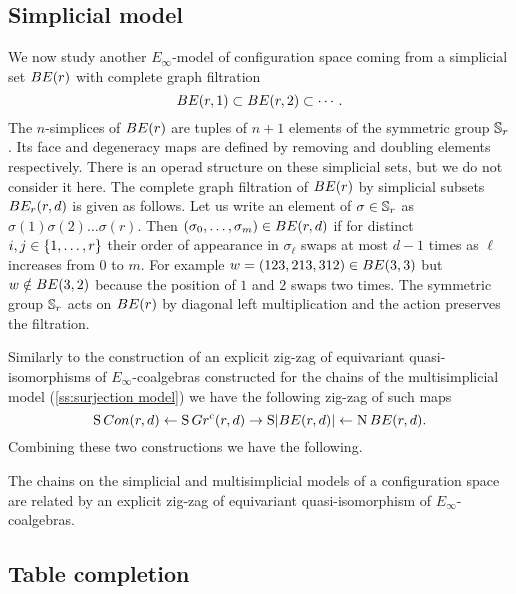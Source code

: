 \subsection{Simplicial model}\label{ss:simplicial model}

We now study another $E_\infty$-model of configuration space coming from a simplicial set $BE(r)$ with complete graph filtration
\[
BE(r,1) \subset BE(r,2) \subset \dotsb \,.
\]
The $n$-simplices of $BE(r)$ are tuples of $n+1$ elements of the symmetric group $\mathbb{S}_r$.
Its face and degeneracy maps are defined by removing and doubling elements respectively.
There is an operad structure on these simplicial sets, but we do not consider it here.
The complete graph filtration of $BE(r)$ by simplicial subsets $BE_r(r,d)$ is given as follows.
Let us write an element of $\sigma \in \mathbb{S}_r$ as $\sigma(1)\sigma(2) \dots \sigma(r)$.
Then $(\sigma_0,\dots,\sigma_m) \in BE(r,d)$ if for distinct $i,j \in \{1,\dots,r\}$ their order of appearance in $\sigma_\ell$ swaps at most $d-1$ times as $\ell$ increases from $0$ to $m$.
For example $w = (123,213,312) \in BE(3,3)$ but $w \notin BE(3,2)$ because the position of $1$ and $2$ swaps two times.
The symmetric group $\mathbb{S}_r$ acts on $BE(r)$ by diagonal left multiplication and the action preserves the filtration.

Similarly to the construction of an explicit zig-zag of equivariant quasi-isomorphisms of $E_\infty$-coalgebras constructed for the chains of the multisimplicial model (\cref{ss:surjection model}) we have the following zig-zag of such maps
\[
\operatorname{S}Con(r,d) \leftarrow \operatorname{S} Gr^{\mathrm{c}}(r,d) \to \operatorname{S}\lvert BE(r,d)\rvert \leftarrow \operatorname{N} BE(r,d).
\]
Combining these two constructions we have the following.
\begin{theorem*}
	The chains on the simplicial and multisimplicial models of a configuration space are related by an explicit zig-zag of equivariant quasi-isomorphism of $E_\infty$-coalgebras.
\end{theorem*}

\subsection{Table completion}\label{ss:table completion}

